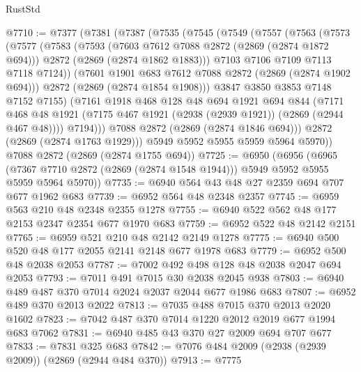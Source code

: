 \begin{lexlean}{RustStd}
\begin{coremodule}
{\begin{coremodule}
{{{{{{{{{{{{@7710 := @7377
    (@7381
      (@7387
        (@7535
          (@7545
            (@7549
              (@7557
                (@7563
                  (@7573
                    (@7577
                      (@7583
                        (@7593
                          (@7603 @7612 @7088 @2872 (@2869 (@2874 @1872 @694)))
                          @2872
                          (@2869 (@2874 @1862 @1883)))
                        @7103
                        @7106
                        @7109
                        @7113
                        @7118
                        @7124))
                    (@7601 @1901 @683 @7612 @7088 @2872 (@2869 (@2874 @1902 @694)))
                    @2872
                    (@2869 (@2874 @1854 @1908)))
                  @3847
                  @3850
                  @3853
                  @7148
                  @7152
                  @7155)
                (@7161
                  @1918
                  @468
                  @128
                  @48
                  @694
                  @1921
                  @694
                  @844
                  (@7171
                    @468
                    @48
                    @1921
                    (@7175 @467 @1921 (@2938 (@2939 @1921)) (@2869 (@2944 @467 @48))))
                  @7194)))
            @7088
            @2872
            (@2869 (@2874 @1846 @694)))
          @2872
          (@2869 (@2874 @1763 @1929)))
        @5949
        @5952
        @5955
        @5959
        @5964
        @5970))
    @7088
    @2872
    (@2869 (@2874 @1755 @694))
@7725 := @6950
    (@6956
      (@6965 (@7367 @7710 @2872 (@2869 (@2874 @1548 @1944))) @5949 @5952 @5955 @5959 @5964 @5970))
@7735 := @6940 @564 @43 @48 @27 @2359 @694 @707 @677 @1962 @683
@7739 := @6952 @564 @48 @2348 @2357
@7745 := @6959 @563 @210 @48 @2348 @2355 @1278
@7755 := @6940 @522 @562 @48 @177 @2153 @2347 @2354 @677 @1970 @683
@7759 := @6952 @522 @48 @2142 @2151
@7765 := @6959 @521 @210 @48 @2142 @2149 @1278
@7775 := @6940 @500 @520 @48 @177 @2055 @2141 @2148 @677 @1978 @683
@7779 := @6952 @500 @48 @2038 @2053
@7787 := @7002 @492 @498 @128 @48 @2038 @2047 @694 @2053
@7793 := @7011 @491 @7015 @30 @2038 @2045 @938
@7803 := @6940 @489 @487 @370 @7014 @2024 @2037 @2044 @677 @1986 @683
@7807 := @6952 @489 @370 @2013 @2022
@7813 := @7035 @488 @7015 @370 @2013 @2020 @1602
@7823 := @7042 @487 @370 @7014 @1220 @2012 @2019 @677 @1994 @683 @7062
@7831 := @6940 @485 @43 @370 @27 @2009 @694 @707 @677
@7833 := @7831 @325 @683
@7842 := @7076 @484 @2009 (@2938 (@2939 @2009)) (@2869 (@2944 @484 @370))
@7913 := @7775
}}}}}}}}}}}}
\end{coremodule}}
\end{coremodule}
\end{lexlean}
